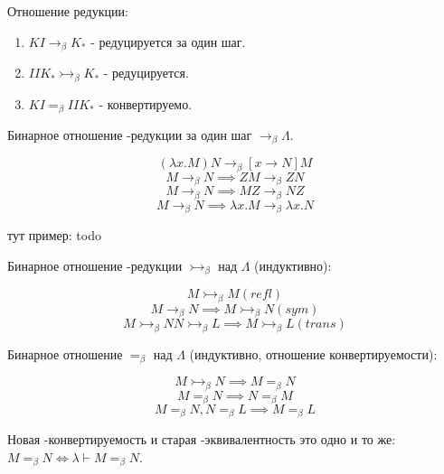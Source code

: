 \begin{definition}
    Отношение редукции:
    \begin{enumerate}
        \item $KI \rightarrow_{\beta} K_*$ - редуцируется за один шаг.
        \item $IIK_* \rightarrowtail_{\beta} K_*$ - редуцируется.
        \item $KI =_{\beta} IIK_*$ - конвертируемо.
    \end{enumerate}
\end{definition}

\begin{definition}
    Бинарное отношение \beta-редукции за один шаг $\rightarrow_{\beta} \Lambda$.

    $$ (\lambda x. M) N \rightarrow_{\beta} [x \rightarrow N] M $$
    $$ M \rightarrow_{\beta} N \implies ZM \rightarrow_{\beta} ZN $$
    $$ M \rightarrow_{\beta} N \implies MZ \rightarrow_{\beta} NZ $$
    $$ M \rightarrow_{\beta} N \implies \lambda x. M \rightarrow_{\beta} \lambda x. N $$
\end{definition}
\begin{example}
    тут пример: todo
\end{example}

\begin{definition}
    Бинарное отношение \beta-редукции $\rightarrowtail_{\beta}$ над $\Lambda$ (индуктивно):

    $$ M \rightarrowtail_{\beta} M (refl) $$
    $$ M \rightarrow_{\beta} N\implies M \rightarrowtail_{\beta} N (sym)$$
    $$ M \rightarrowtail_{\beta} N N \rightarrowtail_{\beta} L \implies M \rightarrowtail_{\beta} L (trans) $$
\end{definition}

\begin{definition}
    Бинарное отношение $=_{\beta}$ над $\Lambda$ (индуктивно, отношение конвертируемости):

    $$ M \rightarrowtail_{\beta} N\implies M =_{\beta} N $$
    $$ M =_{\beta} N \implies N =_{\beta} M $$
    $$ M =_{\beta} N, N =_{\beta} L \implies M =_{\beta} L $$
\end{definition}

\begin{statement}
    Новая \beta-конвертируемость и старая \beta-эквивалентность это одно и то же: $M =_{\beta} N \Leftrightarrow \lambda \vdash M =_{\beta} N$.
\end{statement}

